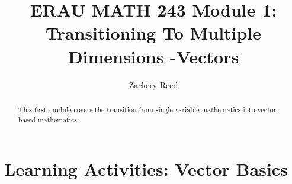 \documentclass{xourse}
\title{ERAU MATH 243 Module 1: Transitioning To Multiple Dimensions -Vectors}
\author{Zackery Reed}
\begin{document}
\begin{abstract}
This first module covers the transition from single-variable mathematics into vector-based mathematics.
\end{abstract}
\maketitle

\part{Learning Activities: Vector Basics}
\sectionstyle



\end{document}
